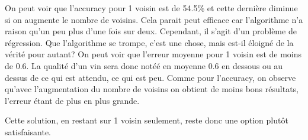 \vspace{1cm}

On peut voir que l'accuracy pour 1 voisin est de 54.5\% et cette dernière diminue si on augmente le nombre de voisins. Cela parait peut efficace car l'algorithme n'a raison qu'un peu plus d'une fois sur deux. Cependant, il s'agit d'un problème de régression. Que l'algorithme se trompe, c'est une chose, mais est-il éloigné de la vérité pour autant? On peut voir que l'erreur moyenne pour 1 voisin est de moins de 0.6. La qualité d'un vin sera donc notéé en moyenne 0.6 en dessous ou au dessus de ce qui est attendu, ce qui est peu. Comme pour l'accuracy, on observe qu'avec l'augmentation du nombre de voisins on obtient de moins bons résultats, l'erreur étant de plus en plus grande.

Cette solution, en restant sur 1 voisin seulement, reste donc une option plutôt satisfaisante.